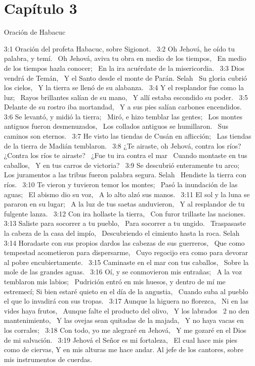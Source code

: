 \section*{Capítulo 3}
Oración de Habacuc  

3:1 Oración del profeta Habacuc, sobre Sigionot.  
3:2 Oh Jehová, he oído tu palabra, y temí.  
Oh Jehová, aviva tu obra en medio de los tiempos,  
En medio de los tiempos hazla conocer;  
En la ira acuérdate de la misericordia.  
3:3 Dios vendrá de Temán,  
Y el Santo desde el monte de Parán. Selah  
Su gloria cubrió los cielos,  
Y la tierra se llenó de su alabanza.  
3:4 Y el resplandor fue como la luz;  
Rayos brillantes salían de su mano,  
Y allí estaba escondido su poder.  
3:5 Delante de su rostro iba mortandad,  
Y a sus pies salían carbones encendidos.  
3:6 Se levantó, y midió la tierra;  
Miró, e hizo temblar las gentes;  
Los montes antiguos fueron desmenuzados,  
Los collados antiguos se humillaron.  
Sus caminos son eternos.  
3:7 He visto las tiendas de Cusán en aflicción;  
Las tiendas de la tierra de Madián temblaron.  
3:8 ¿Te airaste, oh Jehová, contra los ríos?  
¿Contra los ríos te airaste?  
¿Fue tu ira contra el mar  
Cuando montaste en tus caballos,  
Y en tus carros de victoria?  
3:9 Se descubrió enteramente tu arco;  
Los juramentos a las tribus fueron palabra segura. Selah  
Hendiste la tierra con ríos.  
3:10 Te vieron y tuvieron temor los montes;  
Pasó la inundación de las aguas;  
El abismo dio su voz,  
A lo alto alzó sus manos.  
3:11 El sol y la luna se pararon en su lugar;  
A la luz de tus saetas anduvieron,  
Y al resplandor de tu fulgente lanza.  
3:12 Con ira hollaste la tierra,  
Con furor trillaste las naciones.  
3:13 Saliste para socorrer a tu pueblo,  
Para socorrer a tu ungido.  
Traspasaste la cabeza de la casa del impío,  
Descubriendo el cimiento hasta la roca. Selah  
3:14 Horadaste con sus propios dardos las cabezas de sus guerreros,  
Que como tempestad acometieron para dispersarme,  
Cuyo regocijo era como para devorar al pobre encubiertamente.  
3:15 Caminaste en el mar con tus caballos,  
Sobre la mole de las grandes aguas.  
3:16 Oí, y se conmovieron mis entrañas;  
A la voz temblaron mis labios;  
Pudrición entró en mis huesos, y dentro de mí me estremecí; 
Si bien estaré quieto en el día de la angustia,  
Cuando suba al pueblo el que lo invadirá con sus tropas.  
3:17 Aunque la higuera no florezca,  
Ni en las vides haya frutos,  
Aunque falte el producto del olivo,  
Y los labrados  
2 no den mantenimiento,  
Y las ovejas sean quitadas de la majada,  
Y no haya vacas en los corrales;  
3:18 Con todo, yo me alegraré en Jehová,  
Y me gozaré en el Dios de mi salvación.  
3:19 Jehová el Señor es mi fortaleza,  
El cual hace mis pies como de ciervas, 
Y en mis alturas me hace andar. 
Al jefe de los cantores, sobre mis instrumentos de cuerdas.

